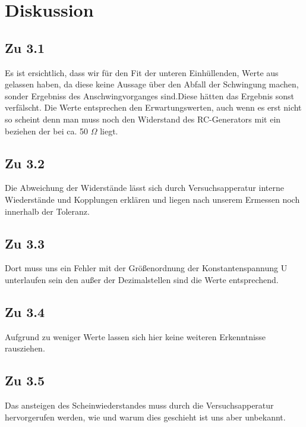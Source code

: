 \section{Diskussion}
\label{sec:Diskussion}
\subsection{Zu 3.1}
  Es ist ersichtlich, dass wir für den Fit der unteren Einhüllenden, Werte aus gelassen haben, da
  diese keine Aussage über den Abfall der Schwingung machen, sonder Ergebniss des Anschwingvorganges sind.Diese
  hätten das Ergebnis sonst verfälscht. Die Werte entsprechen den Erwartungswerten, auch wenn es erst
  nicht so scheint denn man muss noch den Widerstand des RC-Generators mit ein beziehen der bei ca. 50 $\Omega$ liegt.
  \subsection{Zu 3.2}
  Die Abweichung der Widerstände lässt sich durch Versuchsapperatur interne Wiederstände und Kopplungen erklären
  und liegen nach unserem Ermessen noch innerhalb der Toleranz.
  \subsection{Zu 3.3}
  Dort muss uns ein Fehler mit der Größenordnung der Konstantenspannung U unterlaufen sein den außer
  der Dezimalstellen sind die Werte entsprechend.
  \subsection{Zu 3.4}
    Aufgrund zu weniger Werte lassen sich hier keine weiteren Erkenntnisse rausziehen.
  \subsection{Zu 3.5}
   Das ansteigen des Scheinwiederstandes muss durch die Versuchsapperatur hervorgerufen werden, wie und warum dies geschieht ist uns aber unbekannt.
